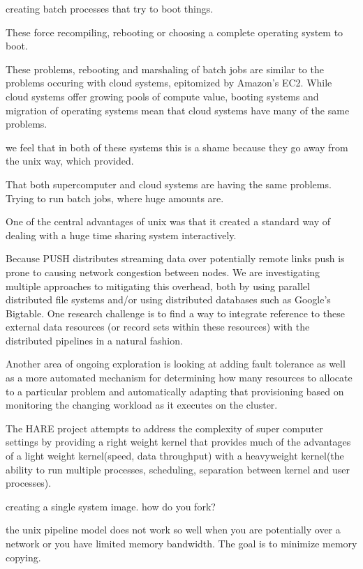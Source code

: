 \documentclass{sig-alt-release2}
\begin{document}
creating batch processes that try to boot things.

These force recompiling, rebooting or choosing a complete operating
system to boot.

These problems, rebooting and marshaling of batch jobs are similar
to the problems occuring with cloud systems, epitomized by Amazon's
EC2. While cloud systems offer growing pools of compute value,
booting systems and migration of operating systems mean that cloud
systems have many of the same problems.

we feel that in both of these systems this is a shame because they
go away from the unix way, which provided.

That both supercomputer and cloud systems are having the same
problems. Trying to run batch jobs, where huge amounts are.

One of the central advantages of unix was that it created a standard
way of dealing with a huge time sharing system interactively.


Because PUSH distributes streaming data over potentially remote links push 
is prone to causing network congestion between nodes. 
We are investigating multiple approaches to mitigating this overhead, both
by using parallel distributed file systems and/or using distributed
databases such as Google's Bigtable.
One research challenge is to find a way to integrate reference to these
external data resources (or record sets within these resources) with the
distributed pipelines in a natural fashion.

Another area of ongoing exploration is looking at adding fault tolerance as 
well as a more automated mechanism for determining how many resources to 
allocate to a particular problem and automatically adapting that provisioning 
based on monitoring the changing workload as it executes on the 
cluster.


The HARE project attempts to address the complexity of super computer settings by providing a right weight kernel that provides much of the advantages of a light weight kernel(speed, data throughput) with a heavyweight kernel(the ability to run multiple processes, scheduling, separation between kernel and user processes). 

creating a single system image. how do you fork?  

the unix pipeline model does not work so well when you are potentially over a network or you have limited memory bandwidth. The goal is to minimize memory copying. 
\end{document}
